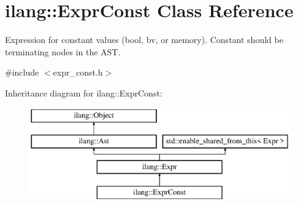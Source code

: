 \hypertarget{classilang_1_1_expr_const}{}\section{ilang\+:\+:Expr\+Const Class Reference}
\label{classilang_1_1_expr_const}


Expression for constant values (bool, bv, or memory). Constant should be terminating nodes in the A\+ST.  




{\ttfamily \#include $<$expr\+\_\+const.\+h$>$}

Inheritance diagram for ilang\+:\+:Expr\+Const\+:\begin{figure}[H]
\begin{center}
\leavevmode
\includegraphics[height=4.000000cm]{classilang_1_1_expr_const}
\end{center}
\end{figure}
